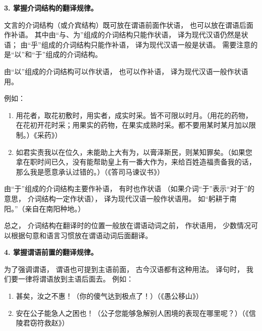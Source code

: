 \textbf{3. 掌握介词结构的翻译规律。}

文言的介词结构（或介宾结构）既可放在谓语前面作状语，
也可以放在谓语后面作补语。
其中由“与、为”组成的介词结构只能作状语，
译为现代汉语仍然是状语；
由“乎”组成的介词结构只能作补语，
译为现代汉语一般是状语。
需要注意的是“以”和“于”组成的介词结构。

由“以”组成的介词结构可以作状语，
也可以作补语，
译为现代汉语一般作状语用。

例如：
\newpage

\noindent
\begin{enumerate}[label=\textcircled{\arabic*}]
	\item 用花者，取花初敷时，用实者，成实时采。皆不可限以时月。（用花的药物，在花初开花时采；用果实的药物，在果实成熟时采。都不要用某时某月加以限制。）《采药》）
	\item 如君实责我以在位久，未能助上大有为，以膏泽斯民，则某知罪矣。（如果您拿在职时间已久，没有能帮助皇上有一番大作为，来给百姓造福责备我的话，那么我是愿意承认过错的。）（《答司马谏议书》）
\end{enumerate}

由“于”组成的介词结构主要作补语，
有时也作状语
（如果介词“于”表示“对于”的意思，
介词结构一定作状语），
译为现代汉语一般作状语用。
如“躬耕于南阳。”（亲自在南阳种地。）

总之，
介词结构在翻译时的位置一般放在谓语动词之前，
作状语用，
少数情况可以根据句意和语言习惯放在谓语动词后面翻译。

\textbf{4. 掌握谓语前置的翻译规律。}

为了强调谓语，
谓语也可提到主语前面，
古今汉语都有这种用法。
译句时，
我们要一律将谓语放到主语后面去。
例如：

\noindent
\begin{enumerate}[label=\textcircled{\arabic*}]
	\item 甚矣，汝之不惠！（你的傻气达到极点了！）（《愚公移山》）
	\item 安在公子能急人之困也！（公子您能够急解别人困境的表现在哪里呢？）（《信陵君窃符救赵》）
\end{enumerate}
\newpage